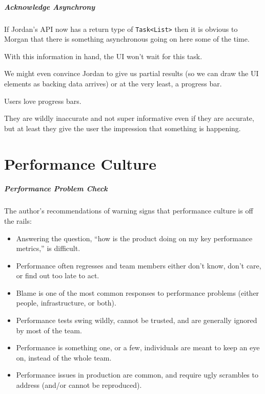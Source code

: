 \begin{frame}
\frametitle{Acknowledge Asynchrony}

If Jordan's API now has a return type of \texttt{Task<List>} then it is obvious to Morgan that there is something asynchronous going on here some of the time. 

With this information in hand, the UI won't wait for this task. 

We might even convince Jordan to give us partial results (so we can draw the UI elements as backing data arrives) or at the very least, a progress bar. 

Users love progress bars. 

They are wildly inaccurate and not super informative even if they are accurate, but at least they give the user the impression that something is happening.

\end{frame}

\part{Performance Culture}

\begin{frame}
\partpage
\end{frame}


\begin{frame}
\frametitle{Performance Problem Check}

The author's recommendations of warning signs that performance culture is off the rails:

\begin{itemize}
\item Answering the question, ``how is the product doing on my key performance metrics,'' is difficult.
\item Performance often regresses and team members either don't know, don't care, or find out too late to act.
\item Blame is one of the most common responses to performance problems (either people, infrastructure, or both).
\item Performance tests swing wildly, cannot be trusted, and are generally ignored by most of the team.
\item Performance is something one, or a few, individuals are meant to keep an eye on, instead of the whole team.
\item Performance issues in production are common, and require ugly scrambles to address (and/or cannot be reproduced).
\end{itemize}

\end{frame}




